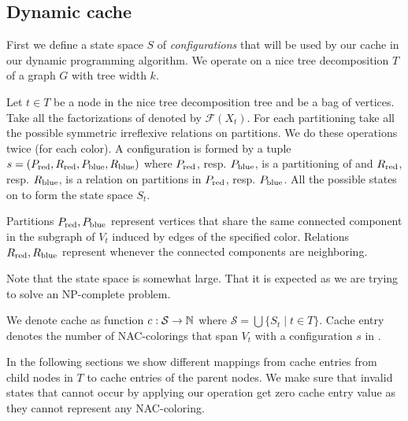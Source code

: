 \subsection{Dynamic cache}

First we define a state space \( S \) of \emph{configurations}
that will be used by our cache in our dynamic programming algorithm.
We operate on a nice tree decomposition \( T \) of a graph \( G \)
with tree width \( k \).

%
\begin{definition}
	Let \( t \in T \) be a node in the nice tree decomposition tree and
	\Xt{} be a bag of vertices.
	Take all the factorizations of \Xt{} denoted by \( \mathcal{F}(X_t) \).
	For each partitioning take all the possible
	symmetric irreflexive relations on partitions.
	We do these operations twice (for each color).
	A configuration is formed by a tuple \( s = (P_{\text{red}}, R_{\text{red}}, P_{\text{blue}}, R_{\text{blue}}) \)
	where \( P_{\text{red}}\), resp. \( P_{\text{blue}} \), is a partitioning of \Xt{}
	and \( R_{\text{red}}\), resp. \(R_{\text{blue}} \), is a relation
	on partitions in \( P_{\text{red}}\), resp. \(P_{\text{blue}} \).
	All the possible states on \Xt{} to form the state space \( S_t \).
\end{definition}
%
Partitions \( P_{\text{red}}, P_{\text{blue}} \) represent vertices
that share the same connected component in the subgraph of \( V_t \)
induced by edges of the specified color.
Relations \( R_{\text{red}}, R_{\text{blue}} \) represent
whenever the connected components are neighboring.

Note that the state space is somewhat large.
That it is expected as we are trying to solve an NP-complete problem.

We denote cache as function \( c: \mathcal{S} \to \mathbb{N} \)
where \( \mathcal{S} = \bigcup\{S_t \mid t \in T\} \).
Cache entry denotes the number of NAC-colorings
that span \( V_t \) with a configuration \( s \) in \Xt{}.

In the following sections we show different mappings from cache entries
from child nodes in \( T \) to cache entries of the parent nodes.
We make sure that invalid states that cannot occur by applying our operation
get zero cache entry value as they cannot represent any NAC-coloring.


\subsection{\IntroduceVertexNode}


